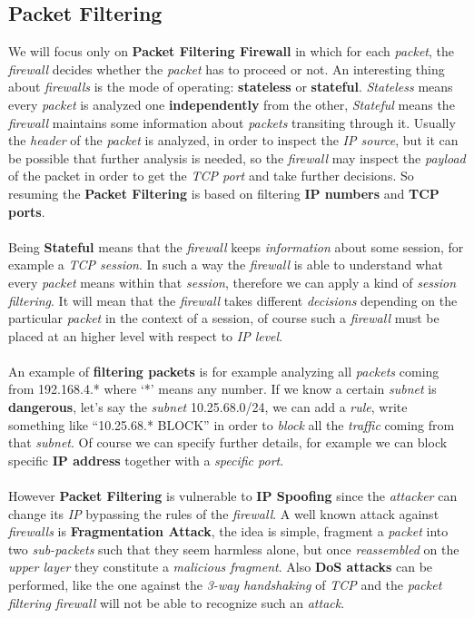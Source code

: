 \documentclass{article}
\begin{document}
\subsection{Packet Filtering}
We will focus only on \textbf{Packet Filtering Firewall} in which for each \emph{packet}, the \emph{firewall} decides whether the \emph{packet} has to proceed or not. An interesting thing about \emph{firewalls} is the mode of operating: \textbf{stateless} or \textbf{stateful}. \emph{Stateless} means every \emph{packet} is analyzed one \textbf{independently} from the other, \emph{Stateful} means the \emph{firewall} maintains some information about \emph{packets} transiting through it. Usually the \emph{header} of the \emph{packet} is analyzed, in order to inspect the \emph{IP source}, but it can be possible that further analysis is needed, so the \emph{firewall} may inspect the \emph{payload} of the packet in order to get the\emph{ TCP port} and take further decisions. So resuming the \textbf{Packet Filtering} is based on filtering\textbf{ IP numbers} and \textbf{TCP ports}.\\\\
Being \textbf{Stateful} means that the \emph{firewall} keeps \emph{information} about some session, for example a \emph{TCP session}. In such a way the \emph{firewall} is able to understand what every \emph{packet} means within that \emph{session}, therefore we can apply a kind of \emph{session filtering}. It will mean that the \emph{firewall} takes different \emph{decisions} depending on the particular \emph{packet} in the context of a session, of course such a \emph{firewall} must be placed at an higher level with respect to \emph{IP level}.\\\\
An example of \textbf{filtering packets} is for example analyzing all \emph{packets} coming from 192.168.4.* where ‘*’ means any number. If we know a certain \emph{subnet} is \textbf{dangerous}, let’s say the \emph{subnet} 10.25.68.0/24, we can add a \emph{rule}, write something like “10.25.68.* BLOCK” in order to \emph{block} all the \emph{traffic} coming from that \emph{subnet}. Of course we can specify further details, for example we can block specific \textbf{IP address} together with a \emph{specific port}.\\\\
However \textbf{Packet Filtering} is vulnerable to \textbf{IP Spoofing} since the \emph{attacker} can change its \emph{IP} bypassing the rules of the \emph{firewall}. A well known attack against \emph{firewalls} is \textbf{Fragmentation Attack}, the idea is simple, fragment a \emph{packet} into two\emph{ sub-packets} such that they seem harmless alone, but once \emph{reassembled} on the \emph{upper layer} they constitute a \emph{malicious fragment}. Also\textbf{ DoS attacks} can be performed, like the one against the\emph{ 3-way handshaking} of \emph{TCP} and the \emph{packet filtering firewall} will not be able to recognize such an \emph{attack}. 
\end{document}
